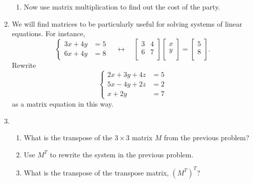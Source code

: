 \documentclass[../gatm_answers.tex]{subfiles}
\begin{document}
\begin{enumerate}
\begin{enumerate}
\item Now use matrix multiplication to find out the cost of the party.
\end{enumerate}
\item We will find matrices to be particularly useful for solving systems of linear equations. For instance, $$\begin{cases}3x+4y&=5 \\ 6x+4y &= 8\end{cases}\quad\longleftrightarrow\quad\left[\begin{array}{cc} 3 & 4 \\ 6 & 7 \\ \end{array}\right]\left[\begin{array}{c} x \\ y \\ \end{array}\right]=\left[\begin{array}{c} 5 \\ 8 \\ \end{array}\right].$$ Rewrite $$\begin{cases}2x+3y+4z&=5 \\ 5x-4y+2z &= 2 \\ x+2y &= 7\end{cases}$$ as a matrix equation in this way.
\item \begin{enumerate}
\item What is the transpose of the $3\times 3$ matrix $M$ from the previous problem?
\item Use $M^T$ to rewrite the system in the previous problem.
\item What is the transpose of the transpose matrix, $(M^T)^T$?
\end{enumerate}
\end{enumerate}
\end{document}
